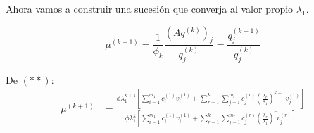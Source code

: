 \documentclass[10pt,a4paper]{article}
\begin{document}
\begin{itemize}
	Ahora vamos a construir una sucesión que converja al valor propio $\lambda_{1}$.

	$$\mu^{(k+1)} = \frac{1}{\phi_{k}}\frac{\left(Aq^{(k)}\right)_{j}}{q_{j}^{(k)}} = \frac{q_{j}^{(k+1)}}{q_{j}^{(k)}}$$

	De $(**)$:
\begin{align*}
	\mu^{(k+1)} &= \frac{\phi\lambda_{1}^{k+1}\left[\sum_{i=1}^{m_{1}}c_{i}^{(1)}v_{i}^{(1)} + \sum_{r=1}^{k}\sum_{j=1}^{m_{r}}c_{j}^{(r)}\left(\frac{\lambda_{r}}{\lambda_{1}}\right)^{k+1}v_{j}^{(r)}\right]}{\phi\lambda_{1}^{k}\left[\sum_{i=1}^{m_{1}}c_{i}^{(1)}v_{i}^{(1)} + \sum_{r=1}^{k}\sum_{j=1}^{m_{r}}c_{j}^{(r)}\left(\frac{\lambda_{r}}{\lambda_{1}}\right)^{r}v_{j}^{(r)}\right]}\\
\end{align*}
	

\end{itemize}
\end{document}
